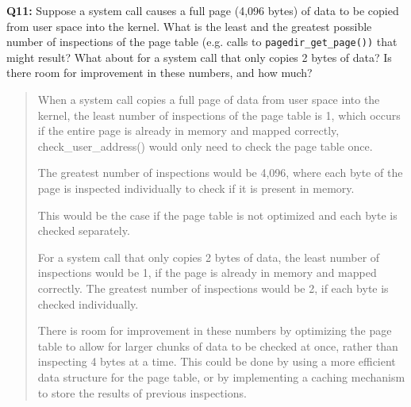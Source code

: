 \documentclass[a4paper,11pt]{paper}
\begin{document}
\newpage
\textbf{Q11:} Suppose a system call causes a full page (4,096 bytes) of data to be copied from user space into the kernel.  What is the least and the greatest possible number of inspections of the page table (e.g. calls to \texttt{pagedir\_get\_page())} that might result?  What about for a system call that only copies 2 bytes of data?  Is there room for improvement in these numbers, and how much?
\begin{quote}
When a system call copies a full page of data from user space into the kernel, the least number of inspections of the page table is 1, which occurs if the entire page is already in memory and mapped correctly, check\_user\_address() would only need to check the page table once.

The greatest number of inspections would be 4,096, where each byte of the page is inspected individually to check if it is present in memory.

This would be the case if the page table is not optimized and each byte is checked separately. 

For a system call that only copies 2 bytes of data, the least number of inspections would be 1, if the page is already in memory and mapped correctly. The greatest number of inspections would be 2, if each byte is checked individually.

There is room for improvement in these numbers by optimizing the page table to allow for larger chunks of data to be checked at once, rather than inspecting 4 bytes at a time. This could be done by using a more efficient data structure for the page table, or by implementing a caching mechanism to store the results of previous inspections.
\end{quote}
\end{document}
